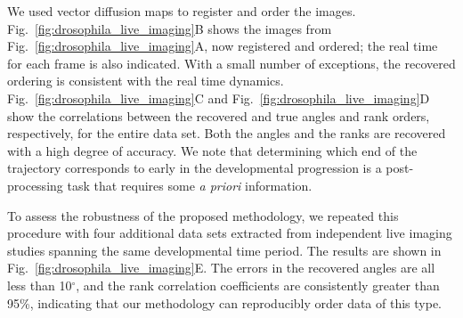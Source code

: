 \documentclass[twocolumn, 10pt]{article}
\newcommand{\fig}[0]{Fig.}
\begin{document}
We used vector diffusion maps to register and order the images.
%
\fig~\ref{fig:drosophila_live_imaging}B shows the images from \fig~\ref{fig:drosophila_live_imaging}A, now registered and ordered; the real time for each frame is also indicated.
%
With a small number of exceptions, the recovered ordering is consistent with the real time dynamics.
%
\fig~\ref{fig:drosophila_live_imaging}C and \fig~\ref{fig:drosophila_live_imaging}D  show the correlations between the recovered and true angles and rank orders, respectively, for the entire data set.
%
Both the angles and the ranks are recovered with a high degree of accuracy.
%
We note that determining which end of the trajectory corresponds to early in the developmental progression is a post-processing task that requires some {\em a priori} information. 

To assess the robustness of the proposed methodology, we repeated this procedure with four additional data sets extracted from independent live imaging studies spanning the same developmental time period.
%
The results are shown in \fig~\ref{fig:drosophila_live_imaging}E.
%
The errors in the recovered angles are all less than 10$^\circ$, and the rank correlation coefficients are consistently greater than 95\%, indicating that our methodology can reproducibly order data of this type.
%
%
%
%
\end{document}

